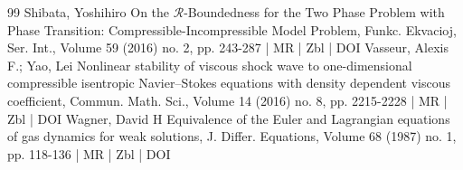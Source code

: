 \begin{thebibliography}{99}
 Shibata, Yoshihiro On the $\mathcal{R}$-Boundedness for the Two Phase Problem with Phase Transition: Compressible-Incompressible Model Problem, Funkc. Ekvacioj, Ser. Int., Volume 59 (2016) no. 2, pp. 243-287 | MR | Zbl | DOI
 Vasseur, Alexis F.; Yao, Lei Nonlinear stability of viscous shock wave to one-dimensional compressible isentropic Navier–Stokes equations with density dependent viscous coefficient, Commun. Math. Sci., Volume 14 (2016) no. 8, pp. 2215-2228 | MR | Zbl | DOI
 Wagner, David H Equivalence of the Euler and Lagrangian equations of gas dynamics for weak solutions, J. Differ. Equations, Volume 68 (1987) no. 1, pp. 118-136 | MR | Zbl | DOI
\end{thebibliography}
